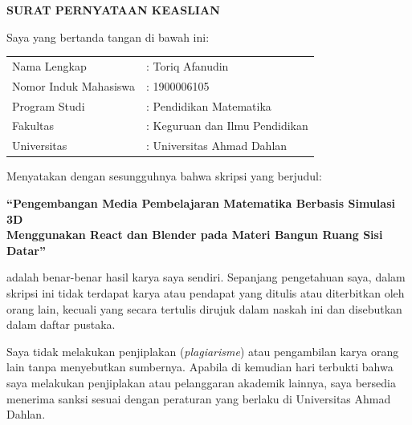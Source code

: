 \pagestyle{empty}
\begin{center}
    \textbf{SURAT PERNYATAAN KEASLIAN}
\end{center}

\vspace{0.5cm}

\noindent Saya yang bertanda tangan di bawah ini:

\vspace{0.2cm}

\noindent
\begin{tabular}{ll}
    Nama Lengkap            & : Toriq Afanudin \\
    Nomor Induk Mahasiswa   & : 1900006105 \\
    Program Studi           & : Pendidikan Matematika \\
    Fakultas                & : Keguruan dan Ilmu Pendidikan \\
    Universitas             & : Universitas Ahmad Dahlan
\end{tabular}

\vspace{0.3cm}

\noindent Menyatakan dengan sesungguhnya bahwa skripsi yang berjudul:

\vspace{0.2cm}

\begin{center}
    \textbf{“Pengembangan Media Pembelajaran Matematika Berbasis Simulasi 3D} \\
    \textbf{Menggunakan React dan Blender pada Materi Bangun Ruang Sisi Datar”}
\end{center}

\vspace{0.2cm}

\noindent adalah benar-benar hasil karya saya sendiri. Sepanjang pengetahuan saya, dalam skripsi ini tidak terdapat karya atau pendapat yang ditulis atau diterbitkan oleh orang lain, kecuali yang secara tertulis dirujuk dalam naskah ini dan disebutkan dalam daftar pustaka.

\vspace{0.2cm}

\noindent Saya tidak melakukan penjiplakan (\textit{plagiarisme}) atau pengambilan karya orang lain tanpa menyebutkan sumbernya. Apabila di kemudian hari terbukti bahwa saya melakukan penjiplakan atau pelanggaran akademik lainnya, saya bersedia menerima sanksi sesuai dengan peraturan yang berlaku di Universitas Ahmad Dahlan.

